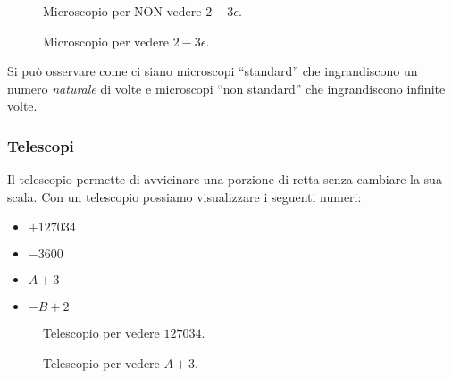 \begin{figure}[h]
\begin{inaccessibleblock}

\begin{minipage}{.48\linewidth}
 \begin{center}
\microscopioc
 \end{center}
\caption{Microscopio per NON vedere \(2-3\epsilon\).} \label{fig:microscopioc}
\end{minipage}
\hfill
\begin{minipage}{.48\linewidth}
 \begin{center}
\microscopiod
 \end{center}
\caption{Microscopio per vedere \(2-3\epsilon\).} \label{fig:microscopiod}
\end{minipage}

\end{inaccessibleblock}
\end{figure}
 
Si può osservare come ci siano microscopi ``standard'' che ingrandiscono un 
numero \emph{naturale} di volte e microscopi ``non standard'' che 
ingrandiscono 
infinite volte.

\subsubsection{Telescopi}
\label{subsec:insnum_microscopio}

Il telescopio permette di avvicinare una porzione di retta senza cambiare la 
sua scala. 
Con un telescopio possiamo visualizzare i seguenti numeri:

\begin{multicols}{4}
\begin{itemize}[nosep]
 \item $+127034$
 \item $-3600$
 \item $A+3$
 \item $-B+2$
\end{itemize}
\end{multicols}
\vspace{-5mm}
\begin{figure}[h]
\begin{inaccessibleblock}

\begin{minipage}{.48\linewidth}
 \begin{center}
\telescopioa
 \end{center}
\caption{Telescopio per vedere \(127034\).} \label{fig:telescopioa}
\end{minipage}
\hfill
\begin{minipage}{.48\linewidth}
 \begin{center}
\telescopiob
 \end{center}
\caption{Telescopio per vedere \(A+3\).} \label{fig:telescopiob}
\end{minipage}

\end{inaccessibleblock}
\end{figure}

